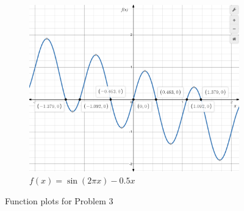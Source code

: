 \documentclass[11pt]{article}
\newcommand{\1}{\mathbbm{1}}
\begin{document}
\begin{figure}[htbp]
\begin{subfigure}[b]{0.48\textwidth}
		\includegraphics[width=\textwidth]{f3.png}
		\caption{$f(x)=\sin(2\pi x)-0.5x$}
		\label{3e}
	\end{subfigure}
	\caption{Function plots for Problem 3}
	\label{fig:3}
\end{figure}
\end{document}

